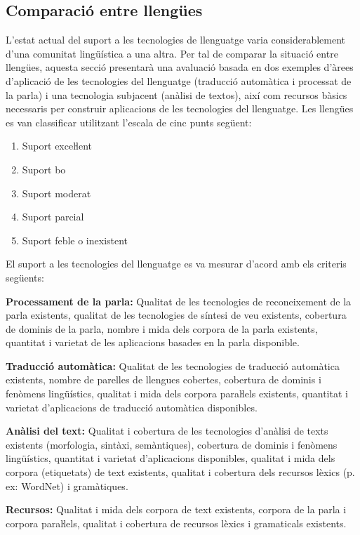 \begin{multicols}{2}
\subsection{Comparació entre llengües}

L'estat actual del suport a les tecnologies de llenguatge varia considerablement d'una comunitat lingüística a una altra. Per tal de comparar la situació entre llengües, aquesta secció presentarà una avaluació basada en dos exemples d'àrees d'aplicació de les tecnologies del llenguatge (traducció automàtica i processat de la parla) i una tecnologia subjacent (anàlisi de textos), així com recursos bàsics necessaris per construir aplicacions de les tecnologies del llenguatge.
Les llengües es van classificar utilitzant l'escala de cinc punts següent:

\begin{enumerate}
\item Suport exceŀlent
\item Suport bo
\item Suport moderat
\item Suport parcial
\item Suport feble o inexistent
\end{enumerate}

El suport a les tecnologies del llenguatge es va mesurar d'acord amb els criteris següents:

\textbf{Processament de la parla:} Qualitat de les tecnologies de reconeixement de la parla existents, qualitat de les tecnologies de síntesi de veu  existents, cobertura de dominis de la parla, nombre i mida dels corpora de la parla existents, quantitat i varietat de les aplicacions basades en la parla disponible.

\textbf{Traducció automàtica:} Qualitat de les tecnologies de traducció automàtica existents, nombre de parelles de llengues cobertes, cobertura de dominis i fenòmens lingüístics, qualitat i mida dels corpora paraŀlels existents, quantitat i varietat d'aplicacions de traducció automàtica disponibles.

\textbf{Anàlisi del text:} Qualitat i cobertura de les tecnologies d'anàlisi de texts existents (morfologia, sintàxi, semàntiques), cobertura de dominis i fenòmens lingüístics, quantitat i varietat d'aplicacions disponibles, qualitat i mida dels corpora (etiquetats) de text existents, qualitat i cobertura dels recursos lèxics (p. ex: WordNet) i gramàtiques.

\textbf{Recursos:} Qualitat i mida dels corpora de text existents, corpora de la parla i corpora paraŀlels, qualitat i cobertura de recursos lèxics i gramaticals existents.


\end{multicols}
